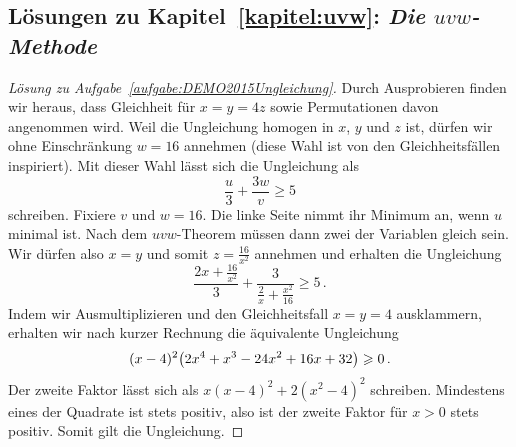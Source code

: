 
\subsection*{Lösungen zu Kapitel~\ref{kapitel:uvw}: \emph{Die \texorpdfstring{$uvw$}{uvw}-Methode}}

\begin{proof}[Lösung zu Aufgabe~\ref{aufgabe:DEMO2015Ungleichung}]
	Durch Ausprobieren finden wir heraus, dass Gleichheit für $x=y=4z$ sowie Permutationen davon angenommen wird. Weil die Ungleichung homogen in $x$, $y$ und $z$ ist, dürfen wir ohne Einschränkung $w=16$ annehmen (diese Wahl ist von den Gleichheitsfällen inspiriert). Mit dieser Wahl lässt sich die Ungleichung als
	\begin{equation*}
		\frac{u}{3}+\frac{3w}{v}\geqslant 5
	\end{equation*}
	schreiben. Fixiere $v$ und $w=16$. Die linke Seite nimmt ihr Minimum an, wenn $u$ minimal ist. Nach dem $uvw$-Theorem müssen dann zwei der Variablen gleich sein. Wir dürfen also $x=y$ und somit $z=\frac{16}{x^2}$ annehmen und erhalten die Ungleichung
	\begin{equation*}
		\frac{2x+\frac{16}{x^2}}{3}+\frac{3}{\frac2x+\frac{x^2}{16}}\geqslant 5\,.
	\end{equation*}
	Indem wir Ausmultiplizieren und den Gleichheitsfall $x=y=4$ ausklammern, erhalten wir nach kurzer Rechnung die äquivalente Ungleichung
	\begin{equation*}
		(x-4)^2\parens*{2x^4+x^3-24x^2+16x+32}\geqslant 0\,.
	\end{equation*}
	Der zweite Faktor lässt sich als $x(x-4)^2+2(x^2-4)^2$ schreiben. Mindestens eines der Quadrate ist stets positiv, also ist der zweite Faktor für $x>0$ stets positiv. Somit gilt die Ungleichung.
\end{proof}

